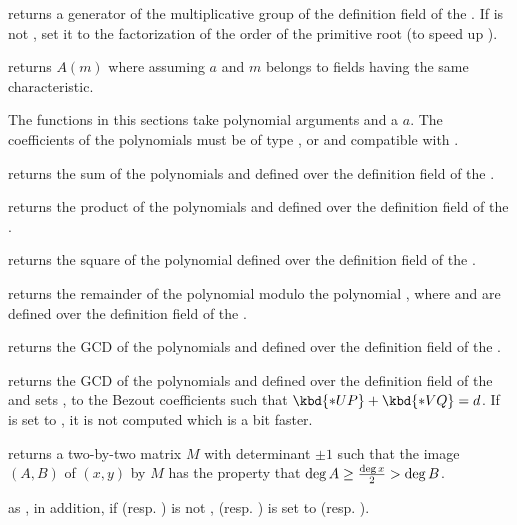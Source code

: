  returns a generator of the
multiplicative group of the definition field of the  .
If  is not , set it to the factorization of the order
of the primitive root (to speed up ).

 returns $A(m)$ where  assuming
$a$ and $m$ belongs to fields having the same characteristic.


The functions in this sections take polynomial arguments and a 
$a$. The coefficients of the polynomials must be of type ,
 or  and compatible with .

 returns the sum of the polynomials
 and  defined over the definition field of the 
.

 returns the product of the polynomials
 and  defined over the definition field of the 
.

 returns the square of the polynomial
 defined over the definition field of the  .

 returns the remainder
of the polynomial  modulo the polynomial , where  and
 are defined over the definition field of the  .

 returns the GCD of the polynomials
 and  defined over the definition field of the 
.

returns the GCD of the polynomials  and  defined over
the definition field of the   and sets ,  to
the Bezout coefficients such that $\kbd{*UP} + \kbd{*VQ} = d$.  If  is
set to , it is not computed which is a bit faster.

 returns a two-by-two matrix
$M$ with determinant $\pm 1$ such that the image $(A,B)$ of $(x,y)$ by $M$
has the property that $\deg A \geq {\deg x \over 2} > \deg B$.

as , in addition, if  (resp. ) is not
,  (resp. ) is set to  (resp. ).

